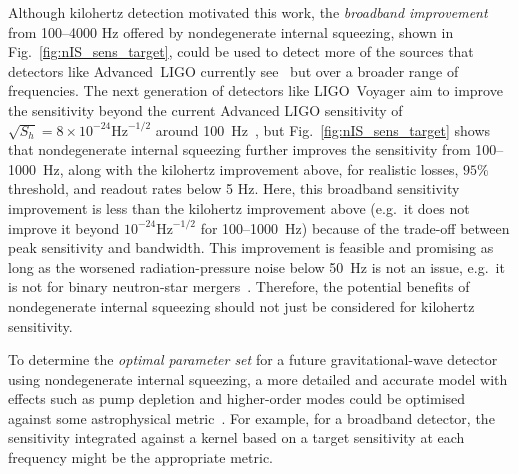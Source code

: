 Although kilohertz detection motivated this work, the \emph{broadband improvement} from 100--4000 Hz offered by nondegenerate internal squeezing, shown in Fig.~\ref{fig:nIS_sens_target}, could be used to detect more of the sources that detectors like Advanced~LIGO currently see~\cite{} but over a broader range of frequencies. %
The next generation of detectors like LIGO~Voyager aim to improve the sensitivity beyond the current Advanced LIGO sensitivity of $\sqrt{S_h}=8\times10^{-24}\text{Hz}^{-1/2}$ around 100~Hz~\cite{PhysRevD.93.112004}, but Fig.~\ref{fig:nIS_sens_target} shows that nondegenerate internal squeezing further improves the sensitivity from 100--1000~Hz, along with the kilohertz improvement above, for realistic losses, $95\%$ threshold, and readout rates below 5 Hz. Here, this broadband sensitivity improvement is less than the kilohertz improvement above (e.g.\ it does not improve it beyond $10^{-24}\text{Hz}^{-1/2}$ for 100--1000~Hz) because of the trade-off between peak sensitivity and bandwidth. This improvement is feasible and promising as long as the worsened radiation-pressure noise below 50~Hz is not an issue, e.g.\ it is not for binary neutron-star mergers~\cite{}. Therefore, the potential benefits of nondegenerate internal squeezing should not just be considered for kilohertz sensitivity.


To determine the \emph{optimal parameter set} for a future gravitational-wave detector using nondegenerate internal squeezing, a more detailed and accurate model with effects such as pump depletion and higher-order modes could be optimised against some astrophysical metric~\cite{}. For example, for a broadband detector, the sensitivity integrated against a kernel based on a target sensitivity at each frequency might be the appropriate metric. %


